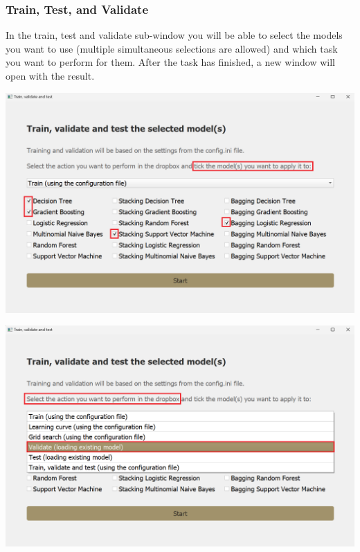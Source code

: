 \subsubsection{Train, Test, and Validate}
\label{subsubsec:train-test-validate}
In the train, test and validate sub-window you will be able to select the models you want to use (multiple simultaneous selections are allowed) and which task you want to perform for them. After the task has finished, a new window will open with the result.
\begin{center}
    \includegraphics[width=16cm]{Images/Usage/Local/Train-Test-Validate-Window1.png}
\end{center}
\begin{center}
    \includegraphics[width=16cm]{Images/Usage/Local/Train-Test-Validate-Window2.png}
\end{center}
